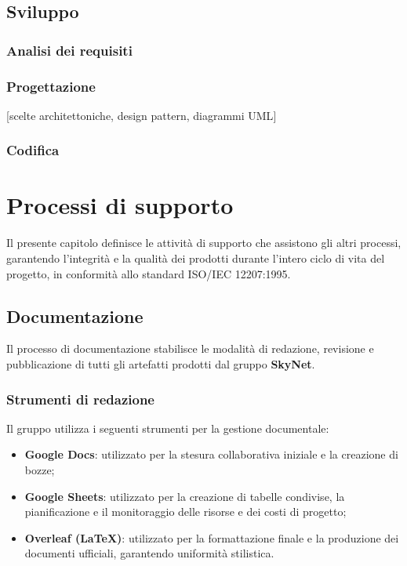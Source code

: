 \documentclass[12pt, a4paper]{article}
\begin{document}
\subsection{Sviluppo}

\subsubsection{Analisi dei requisiti}

\subsubsection{Progettazione}

{[}scelte architettoniche, design pattern, diagrammi UML{]}

\subsubsection{Codifica}

\section{Processi di supporto}

Il presente capitolo definisce le attività di supporto che assistono gli altri processi, garantendo l'integrità e la qualità dei prodotti durante l'intero ciclo di vita del progetto, in conformità allo standard ISO/IEC 12207:1995.

\subsection{Documentazione}
Il processo di documentazione stabilisce le modalità di redazione, revisione e pubblicazione di tutti gli artefatti prodotti dal gruppo \textbf{SkyNet}.

\subsubsection{Strumenti di redazione}
Il gruppo utilizza i seguenti strumenti per la gestione documentale:
\begin{itemize}
    \item \textbf{Google Docs}: utilizzato per la stesura collaborativa iniziale e la creazione di bozze;
    \item \textbf{Google Sheets}: utilizzato per la creazione di tabelle condivise, la pianificazione e il monitoraggio delle risorse e dei costi di progetto;
    \item \textbf{Overleaf (LaTeX)}: utilizzato per la formattazione finale e la produzione dei documenti ufficiali, garantendo uniformità stilistica.
\end{itemize}
\end{document}
